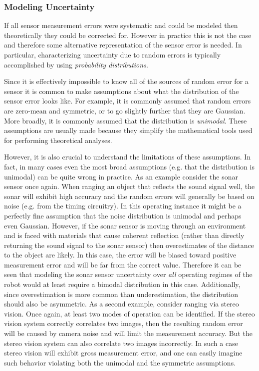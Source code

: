 \subsubsection{Modeling Uncertainty}
If all sensor measurement errors were systematic and could be modeled then theoretically they could be corrected for. However in practice this is not the case and therefore some alternative representation of the sensor error is needed. In particular, characterizing uncertainty due to random errors is typically accomplished by using \textit{probability distributions}.

Since it is effectively impossible to know all of the sources of random error for a sensor it is common to make assumptions about what the distribution of the sensor error looks like. For example, it is commonly assumed that random errors are zero-mean and symmetric, or to go slightly further that they are Gaussian. More broadly, it is commonly assumed that the distribution is \textit{unimodal}. These assumptions are usually made because they simplify the mathematical tools used for performing theoretical analyses. 

However, it is also crucial to understand the limitations of these assumptions. In fact, in many cases even the most broad assumptions (e.g. that the distribution is unimodal) can be quite wrong in practice.
As an example consider the sonar sensor once again. When ranging an object that reflects the sound signal well, the sonar will exhibit high accuracy and the random errors will generally be based on noise (e.g. from the timing circuitry). In this operating instance it might be a perfectly fine assumption that the noise distribution is unimodal and perhaps even Gaussian. However, if the sonar sensor is moving through an environment and is faced with materials that cause coherent reflection (rather than directly returning the sound signal to the sonar sensor) then overestimates of the distance to the object are likely. In this case, the error will be
biased toward positive measurement error and will be far from the correct value. Therefore it can be seen that modeling the sonar sensor uncertainty over \textit{all} operating regimes of the robot would at least require a bimodal distribution in this case. Additionally, since overestimation is more common than underestimation, the distribution should also be asymmetric.
As a second example, consider ranging via stereo vision. Once again, at least two modes of operation can be identified. If the stereo vision system correctly correlates two images, then the resulting random error will be caused by camera noise and will limit the measurement accuracy. But the stereo vision system can also correlate two images incorrectly. In such a case stereo vision will exhibit gross measurement error, and one can easily imagine such behavior violating both the unimodal and the symmetric assumptions.

